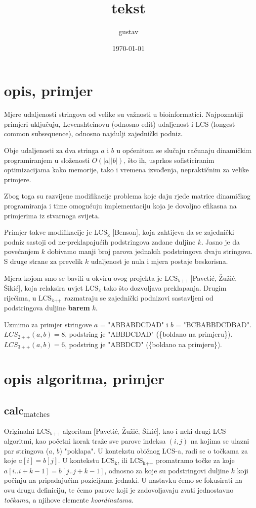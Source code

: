 \documentclass[11pt]{article}
\author{gustav}
\date{\today}
\title{tekst}
\begin{document}
\maketitle
\tableofcontents

\section{opis, primjer}
\label{sec-1}
Mjere udaljenosti stringova od velike su važnosti u bioinformatici.
Najpoznatiji primjeri uključuju, Levenshteinovu (odnosno edit)
udaljenost i LCS (longest common subsequence), odnosno najdulji
zajednički podniz.

Obje udaljenosti za dva stringa $a$ i $b$ u općenitom se slučaju
računaju dinamičkim programiranjem u složenosti $O(|a||b|)$, što ih,
usprkos sofisticiranim optimizacijama kako memorije, tako i vremena
izvođenja, nepraktičnim za velike primjere.

Zbog toga su razvijene modifikacije problema koje daju rjeđe matrice
dinamičkog programiranja i time omogućuju implementaciju koja je 
dovoljno efikasna na primjerima iz stvarnoga svijeta.

Primjer takve modifikacije je LCS$_{\text{k}}$ [Benson], koja zahtijeva da
se zajednički podniz sastoji od ne-preklapajućih podstringova
zadane duljine $k$. Jasno je da povećanjem $k$ dobivamo manji
broj parova jednakih podstringova dvaju stringova. S druge strane
za prevelik $k$ udaljenost je nula i mjera postaje beskorisna.

Mjera kojom smo se bavili u okviru ovog projekta je LCS$_{\text{k++}}$ [Pavetić,
Žužić, Šikić], koja relaksira uvjet LCS$_{\text{k}}$ tako što dozvoljava
preklapanja. Drugim riječima, u LCS$_{\text{k++}}$ razmatraju se zajednički
podnizovi sastavljeni od podstringova duljine \textbf{barem} $k$.

Uzmimo za primjer stringove $a$ = "ABBABDCDAD" i $b$ = "BCBABBDCDBAD".
$LCS_{2++}(a,b) = 8$, podstring je "ABBDCDAD" (\{boldano na primjeru\}).
$LCS_{3++}(a,b) = 6$, podstring je "ABBDCD" (\{boldano na primjeru\}).

\section{opis algoritma, primjer}
\label{sec-2}
\subsection{calc$_{\text{matches}}$}
\label{sec-2-1}
Originalni LCS$_{\text{k++}}$ algoritam [Pavetić, Žužić, Šikić], kao i neki
drugi LCS algoritmi, kao početni korak traže sve parove indeksa $(i,
  j)$ na kojima se ulazni par stringova ($a$, $b$) "poklapa". U
kontekstu običnog LCS-a, radi se o točkama za koje $a[i] = b[j]$.  U
kontekstu LCS$_{\text{k}}$, ili LCS$_{\text{k++}}$ promatramo točke za koje $a[i..i+k-1]
  = b[j..j+k-1]$, odnosno za koje su podstringovi duljine $k$ koji
počinju na pripadajućim pozicijama jednaki. U nastavku ćemo se
fokusirati na ovu drugu definiciju, te ćemo parove koji je
zadovoljavaju zvati jednostavno \emph{točkama}, a njihove elemente
\emph{koordinatama}.
\end{document}
